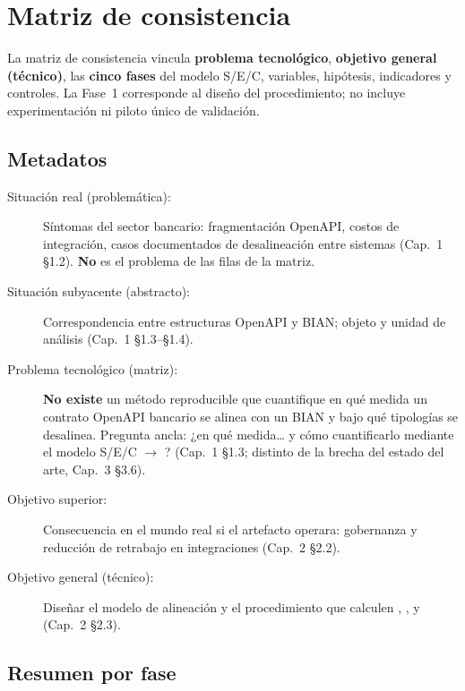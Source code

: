 \chapter{Matriz de consistencia}
\label{anexo:c}

La matriz de consistencia vincula \textbf{problema tecnológico}, \textbf{objetivo general
(técnico)}, las \textbf{cinco fases} del modelo S/E/C, variables, hipótesis, indicadores y
controles. La Fase~1 corresponde al diseño del procedimiento; no incluye experimentación ni piloto
único de validación.

\section{Metadatos}

\begin{description}
  \item[Situación real (problemática):] Síntomas del sector bancario: fragmentación OpenAPI,
        costos de integración, casos documentados de desalineación entre sistemas (Cap.~1 §1.2).
        \textbf{No} es el problema de las filas de la matriz.
  \item[Situación subyacente (abstracto):] Correspondencia entre estructuras OpenAPI y
        \ServiceDomain{} BIAN; objeto y unidad de análisis (Cap.~1 §1.3--§1.4).
  \item[Problema tecnológico (matriz):] \textbf{No existe} un método reproducible que cuantifique
        en qué medida un contrato OpenAPI bancario se alinea con un \ServiceDomain{} BIAN y bajo
        qué tipologías se desalinea. Pregunta ancla: ¿en qué medida… y cómo cuantificarlo mediante
        el modelo S/E/C $\rightarrow$ \AlignmentScore{}? (Cap.~1 §1.3; distinto de la brecha del
        estado del arte, Cap.~3 §3.6).
  \item[Objetivo superior:] Consecuencia en el mundo real si el artefacto operara: gobernanza y
        reducción de retrabajo en integraciones (Cap.~2 §2.2).
  \item[Objetivo general (técnico):] Diseñar el modelo de alineación y el procedimiento que
        calculen \SemanticScore{}, \StructuralScore{}, \CoverageScore{} y
        \AlignmentScore{} (Cap.~2 §2.3).
\end{description}

\section{Resumen por fase}

